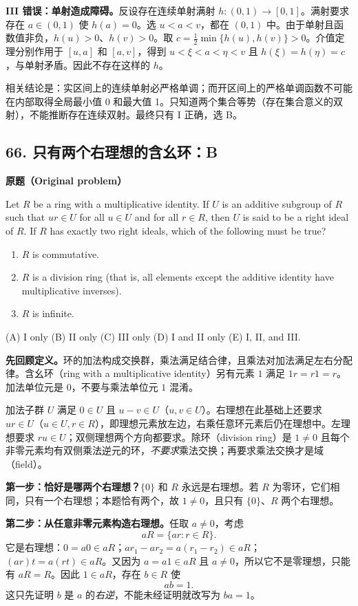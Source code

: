 \documentclass[11pt,a4paper,fontset=fandol]{ctexart}
\begin{document}
\textbf{III 错误：单射造成障碍。}反设存在连续单射满射 $h:(0,1)\to[0,1]$。满射要求存在 $a\in(0,1)$ 使 $h(a)=0$。选 $u<a<v$，都在 $(0,1)$ 中。由于单射且函数值非负，$h(u)>0$、$h(v)>0$。取 $c=\frac12\min\{h(u),h(v)\}>0$。介值定理分别作用于 $[u,a]$ 和 $[a,v]$，得到 $u<\xi<a<\eta<v$ 且 $h(\xi)=h(\eta)=c$，与单射矛盾。因此不存在这样的 $h$。

相关结论是：实区间上的连续单射必严格单调；而开区间上的严格单调函数不可能在内部取得全局最小值 0 和最大值 1。只知道两个集合等势（存在集合意义的双射），不能推断存在连续双射。最终只有 I 正确，选 B。

\subsection{66. 只有两个右理想的含幺环：B}
\label{p2:q66}
\textbf{原题（Original problem）}

Let $R$ be a ring with a multiplicative identity. If $U$ is an additive subgroup of $R$ such that $ur\in U$ for all $u\in U$ and for all $r\in R$, then $U$ is said to be a right ideal of $R$. If $R$ has exactly two right ideals, which of the following must be true?
\begin{enumerate}[label=\Roman*.]
\item $R$ is commutative.
\item $R$ is a division ring (that is, all elements except the additive identity have multiplicative inverses).
\item $R$ is infinite.
\end{enumerate}
(A) I only \quad (B) II only \quad (C) III only \quad (D) I and II only \quad (E) I, II, and III.

\textbf{先回顾定义。}环的加法构成交换群，乘法满足结合律，且乘法对加法满足左右分配律。含幺环（ring with a multiplicative identity）另有元素 $1$ 满足 $1r=r1=r$。加法单位元是 $0$，不要与乘法单位元 $1$ 混淆。

加法子群 $U$ 满足 $0\in U$ 且 $u-v\in U$（$u,v\in U$）。右理想在此基础上还要求 $ur\in U$（$u\in U,r\in R$），即理想元素放左边，右乘任意环元素后仍在理想中。左理想要求 $ru\in U$；双侧理想两个方向都要求。除环（division ring）是 $1\ne0$ 且每个非零元素均有双侧乘法逆元的环，\emph{不要求}乘法交换；再要求乘法交换才是域（field）。

\textbf{第一步：恰好是哪两个右理想？}$\{0\}$ 和 $R$ 永远是右理想。若 $R$ 为零环，它们相同，只有一个右理想；本题恰有两个，故 $1\ne0$，且只有 $\{0\}$、$R$ 两个右理想。

\textbf{第二步：从任意非零元素构造右理想。}任取 $a\ne0$，考虑
\[
aR=\{ar:r\in R\}.
\]
它是右理想：$0=a0\in aR$；$ar_1-ar_2=a(r_1-r_2)\in aR$；$(ar)t=a(rt)\in aR$。又因为 $a=a1\in aR$ 且 $a\ne0$，所以它不是零理想，只能有 $aR=R$。因此 $1\in aR$，存在 $b\in R$ 使
\begin{equation}
ab=1.
\label{p2:right-inverse}
\end{equation}
这只先证明 $b$ 是 $a$ 的\emph{右逆}，不能未经证明就改写为 $ba=1$。
\end{document}
